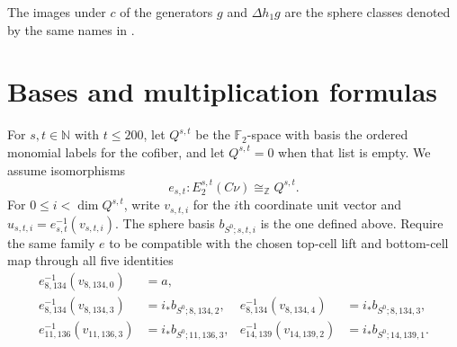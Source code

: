 \begin{theorem}
\label{sem:Computation:literature-labels}
The images under $c$ of the generators $g$ and $\Delta h_1g$ are the
sphere classes denoted by the same names in \cite{LWX126}.
\end{theorem}




\section{Bases and multiplication formulas}


\begin{proposition}
\label{sem:Computation:cofiber-realization-input}
For $s,t\in\mathbb N$ with $t\leq200$, let $Q^{s,t}$ be the
$\mathbb F_2$-space with basis the ordered monomial labels for the
cofiber, and let $Q^{s,t}=0$ when that list is empty. We assume
isomorphisms
\[
e_{s,t}:E_2^{s,t}(C\nu)\cong_{\mathbb Z}Q^{s,t}.
\]
For $0\leq i<\dim Q^{s,t}$, write $v_{s,t,i}$ for the $i$th
coordinate unit vector and $u_{s,t,i}=e_{s,t}^{-1}(v_{s,t,i})$.
The sphere basis $b_{S^0;s,t,i}$ is the one defined above.
Require the same family $e$ to be compatible with the chosen top-cell
lift and bottom-cell map through all five identities
\[
\begin{aligned}
e_{8,134}^{-1}(v_{8,134,0})&=a,\\
e_{8,134}^{-1}(v_{8,134,3})&=i_*b_{S^0;8,134,2},&
e_{8,134}^{-1}(v_{8,134,4})&=i_*b_{S^0;8,134,3},\\
e_{11,136}^{-1}(v_{11,136,3})&=i_*b_{S^0;11,136,3},&
e_{14,139}^{-1}(v_{14,139,2})&=i_*b_{S^0;14,139,1}.
\end{aligned}
\]
\end{proposition}

